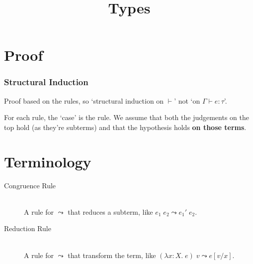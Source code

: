\documentclass[a4paper,11pt]{article}
\title{\vspace{-1cm}Types\vspace{-1cm}}
\author{}
\date{}
\begin{document}
\maketitle
\section{Proof}
{
    \subsubsection*{Structural Induction}
    {

        Proof based on the rules, so `structural induction on \(\vdash\)' not `on \(\Gamma\vdash e : \tau\)'.

        For each rule, the `case' is the rule. We assume that both the judgements on the top hold (as they're subterms)
        and that the hypothesis holds \textbf{on those terms}.
    
    }
}
\section{Terminology}
{
    \begin{description}
    \item[Congruence Rule]\hfill\\A rule for \(\leadsto\) that reduces a subterm, like \(e_1\;e_2 \leadsto e_1'\;e_2\).
    \item[Reduction Rule]\hfill\\A rule for \(\leadsto\) that transform the term, like \((\lambda x:X.\;e)\;v \leadsto
    e[v/x]\).
    \end{description}
}
\end{document}
